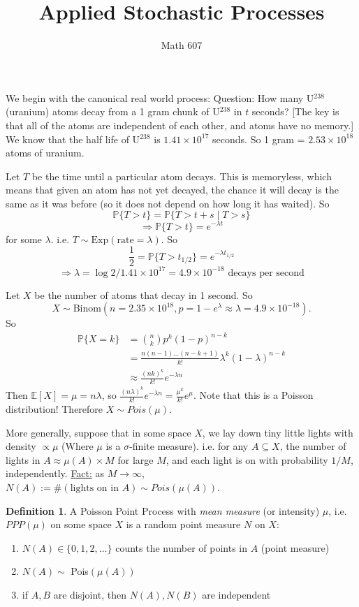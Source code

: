 \documentclass[12pt,letterpaper]{article}
\author{Math 607}
\title{Applied Stochastic Processes}
\theoremstyle{definition}
\newtheorem{defn}[thm]{Definition}
\begin{document}
	\maketitle
	We begin with the canonical real world process:
	Question: How many U$^{238}$ (uranium) atoms decay from a 1 gram chunk of U$^{238}$ in $t$ seconds? [The key is that all of the atoms are independent of each other, and atoms have no memory.] We know that the half life of U$^{238}$ is $1.41 \times 10^{17}$ seconds. So 1 gram = $2.53 \times 10^{18}$ atoms of uranium.
	
	Let $T $ be the time until a particular atom decays. This is memoryless, which means that given an atom has not yet decayed, the chance it will decay is the same as it was before (so it does not depend on how long it has waited). So $$\mathbb{P}\{T > t\} = \mathbb{P}\{T > t+s \mid T > s\}$$
	$$ \Rightarrow \mathbb{P}\{T > t\} = e^{-\lambda t}$$ for some $\lambda$. i.e. $T \sim \text{Exp}(\text{rate} = \lambda)$. So $$\frac{1}{2} = \mathbb{P}\{T > t_{1/2}\} = e^{-\lambda t_{1/2}}$$ $$\Rightarrow \lambda = \log 2 / 1.41 \times 10^{17} = 4.9 \times 10^{-18} \text{ decays per second}$$
	
	Let $X$ be the number of atoms that decay in 1 second. So $$X \sim \text{Binom}(n = 2.35\times10^{18}, p = 1-e^{\lambda} \approx \lambda = 4.9 \times 10^{-18}).$$ So \begin{align*}
	\mathbb{P}\{X = k\} &= {n \choose k} p^k (1-p)^{n-k}\\
	&= \frac{n(n-1) \dots (n-k+1)}{k!}\lambda^k (1-\lambda)^{n-k}\\
	&\approx \frac{(nk)^k}{k!} e^{-\lambda n}
	\end{align*}
	Then $\mathbb{E}[X] = \mu = n\lambda$, so $\frac{(n\lambda)^k}{k!}e^{-\lambda n} = \frac{\mu^k}{k!} e^{\mu}$. Note that this is a Poisson distribution! Therefore $X \sim Pois(\mu)$. 
	
	More generally, suppose that in some space $X$, we lay down tiny little lights with density $\propto \mu$ (Where $\mu$ is a $\sigma$-finite measure). i.e. for any $A \subseteq X$, the number of lights in $A \approx \mu(A) \times M$ for large $M$, and each light is on with probability $1/M$, independently. \underline{Fact:} as $M \rightarrow \infty$, $N(A) := \#(\text{lights on in $A$}) \sim Pois(\mu(A))$. 
	
	\begin{defn}
		A Poisson Point Process with \emph{mean measure} (or intensity) $\mu$, i.e. $PPP(\mu)$ on some space $X$ is a random point measure $N$ on $X$:
		\begin{enumerate}
			\item $N(A) \in \{0,1,2,\ldots\}$ counts the number of points in $A$ (point measure)
			\item $N(A) \sim$ Pois$(\mu(A))$ 
			\item if $A, B$ are disjoint, then $N(A), N(B)$ are independent
		\end{enumerate}
	\end{defn}
\end{document}
